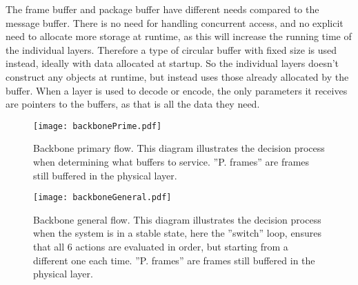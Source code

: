 The frame buffer and package buffer have different needs compared to the message buffer. There is no need for handling concurrent access, and no explicit need to allocate more storage at runtime, as this will increase the running time of the individual layers.
Therefore a type of circular buffer with fixed size is used instead, ideally with data allocated at startup. So the individual layers doesn't construct any objects at runtime, but instead uses those already allocated by the buffer.
When a layer is used to decode or encode, the only parameters it receives are pointers to the buffers, as that is all the data they need.

\begin{figure}[htb]
	\begin{center}
	\texttt{[image: backbonePrime.pdf]}
	\caption{Backbone primary flow. This diagram illustrates the decision process when determining what buffers to service. ''P. frames'' are frames still buffered in the physical layer.}
	\label{fig:backboneprime}	
	\end{center}
\end{figure}

\begin{figure}[htb]
	\begin{center}
	\texttt{[image: backboneGeneral.pdf]}
	\caption{Backbone general flow. This diagram illustrates the decision process when the system is in a stable state, here the ''switch'' loop, ensures that all 6 actions are evaluated in order, but starting from a different one each time. ''P. frames'' are frames still buffered in the physical layer.}
	\label{fig:backbonegeneral}	
	\end{center}
\end{figure}
